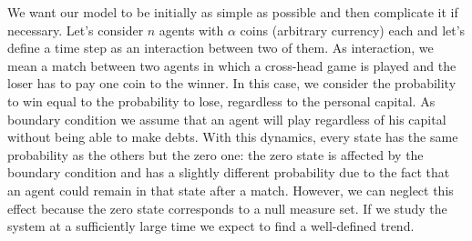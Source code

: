 We want our model to be initially as simple as possible and then complicate it if necessary.
Let's consider $n$ agents with $\alpha$ coins (arbitrary currency) each and let's define a time step as an interaction between two of them.
As interaction, we mean a match between two agents in which a cross-head game is played and the loser has to pay one coin to the winner.
In this case, we consider the probability to win equal to the probability to lose, regardless to the personal capital.
As boundary condition we assume that an agent will play regardless of his capital without being able to make debts. 
With this dynamics, every state has the same probability as the others but the zero one: the zero state is affected by the boundary condition and has a slightly different probability due to the fact that an agent could remain in that state after a match.
However, we can neglect this effect because the zero state corresponds to a null measure set.
If we study the system at a sufficiently large time we expect to find a well-defined trend.

